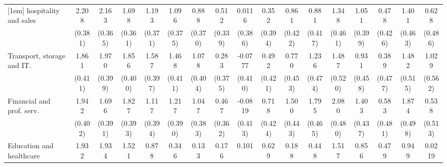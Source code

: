 {\begin{tabular}{l*{16}{c}}
[1em]
hospitality and sales&       2.208\sym{***}&       2.163\sym{***}&       1.698\sym{***}&       1.193\sym{**} &       1.096\sym{**} &       0.888\sym{*}  &       0.512         &      0.0116         &       0.352         &       0.861\sym{*}  &       0.881\sym{*}  &       1.348\sym{**} &       1.051\sym{**} &       0.478         &       1.401\sym{**} &       0.628         \\
                    &     (0.381)         &     (0.365)         &     (0.361)         &     (0.371)         &     (0.375)         &     (0.370)         &     (0.339)         &     (0.386)         &     (0.394)         &     (0.422)         &     (0.417)         &     (0.461)         &     (0.399)         &     (0.426)         &     (0.463)         &     (0.486)         \\
[1em]
Transport, storage and IT.&       1.861\sym{***}&       1.970\sym{***}&       1.856\sym{***}&       1.587\sym{***}&       1.468\sym{***}&       1.078\sym{**} &       0.283         &     -0.0777         &       0.492         &       0.770         &       1.236\sym{**} &       1.487\sym{**} &       0.931\sym{*}  &       0.389         &       1.482\sym{**} &       1.029         \\
                    &     (0.411)         &     (0.399)         &     (0.400)         &     (0.397)         &     (0.411)         &     (0.404)         &     (0.375)         &     (0.410)         &     (0.421)         &     (0.453)         &     (0.474)         &     (0.520)         &     (0.458)         &     (0.477)         &     (0.515)         &     (0.562)         \\
[1em]
Financial and prof. serv.&       1.942\sym{***}&       1.696\sym{***}&       1.827\sym{***}&       1.117\sym{**} &       1.217\sym{**} &       1.047\sym{**} &       0.467         &     -0.0819         &       0.718         &       1.500\sym{***}&       1.795\sym{***}&       2.080\sym{***}&       1.403\sym{**} &       0.583         &       1.874\sym{***}&       0.538         \\
                    &     (0.402)         &     (0.391)         &     (0.393)         &     (0.394)         &     (0.390)         &     (0.383)         &     (0.362)         &     (0.413)         &     (0.424)         &     (0.443)         &     (0.465)         &     (0.480)         &     (0.437)         &     (0.481)         &     (0.498)         &     (0.513)         \\
[1em]
Education and healthcare&       1.932\sym{***}&       1.934\sym{***}&       1.521\sym{**} &       0.878         &       0.346         &       0.133         &       0.176         &       0.101         &       0.629         &       0.188         &       0.448         &       1.517\sym{*}  &       0.856         &       0.479         &       0.949         &      0.0219         \\

\end{tabular}}
